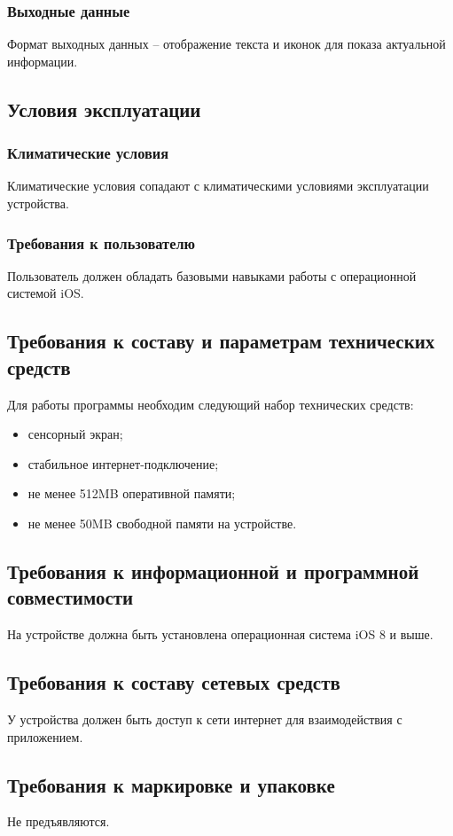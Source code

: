\subsubsection{Выходные данные}

Формат выходных данных -- отображение текста и иконок для показа актуальной информации.

\subsection{Условия эксплуатации}

\subsubsection{Климатические условия}

Климатические условия сопадают с климатическими условиями эксплуатации устройства.

\subsubsection{Требования к пользователю}

Пользователь должен обладать базовыми навыками работы с операционной системой iOS\@.

\subsection{Требования к составу и параметрам технических средств}

Для работы программы необходим следующий набор технических средств:
\begin{itemize}
    \item сенсорный экран;
    \item стабильное интернет-подключение;
    \item не менее 512MB оперативной памяти;
    \item не менее 50MB свободной памяти на устройстве.
\end{itemize}

\subsection{Требования к информационной и программной совместимости}

На устройстве должна быть установлена операционная система iOS 8 и выше.

\subsection{Требования к составу сетевых средств}

У устройства должен быть доступ к сети интернет для взаимодействия с приложением.

\subsection{Требования к маркировке и упаковке}

Не предъявляются.